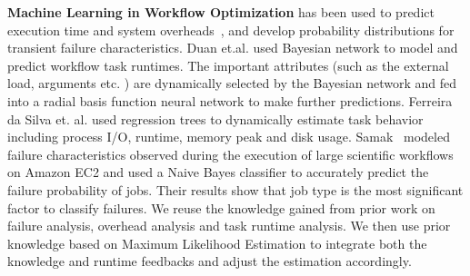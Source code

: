 \textbf{Machine Learning in Workflow Optimization} has been used to predict execution time \cite{Rubing2009, 1015660, 1542747, da2013toward} and system overheads~\cite{Chen2011}, and develop probability distributions for transient failure characteristics. Duan et.al. \cite{Rubing2009} used Bayesian network to model and predict workflow task runtimes. The important attributes (such as the external load, arguments etc. ) are dynamically selected by the Bayesian network and fed into a radial basis function neural network to make further predictions. Ferreira da Silva et. al. \cite{da2013toward} used regression trees to dynamically estimate task behavior including process I/O, runtime, memory peak and disk usage. Samak~\cite{samak2012failure} modeled failure characteristics observed during the execution of large scientific workflows on Amazon EC2 and used a Naive Bayes classifier to accurately predict the failure probability of jobs. Their results show that job type is the most significant factor to classify failures. 
We reuse the knowledge gained from prior work on failure analysis, overhead analysis and task runtime analysis. We then use prior knowledge based on Maximum Likelihood Estimation to integrate both the knowledge and runtime feedbacks and adjust the estimation accordingly. 



